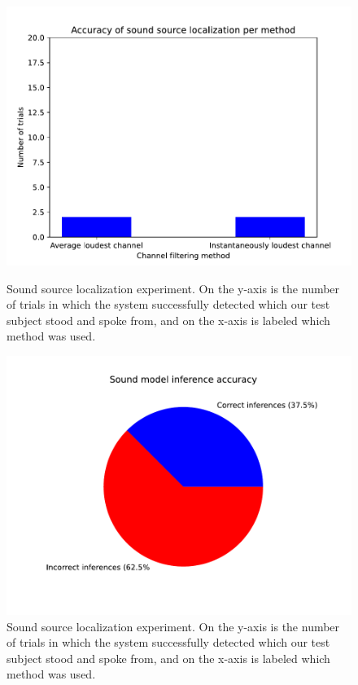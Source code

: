 \documentclass{article}
\begin{document}
\begin{figure}[ht]
\begin{center}
\centerline{\includegraphics[width=\columnwidth]{localization_test}}
\caption{Sound source localization experiment. On the y-axis is the number of trials in which the system successfully detected which our test subject stood and spoke from, and on the x-axis is labeled which method was used.}
\centerline{\includegraphics[width=\columnwidth]{sound_model_accuracy_chart}}
\caption{Sound source localization experiment. On the y-axis is the number of trials in which the system successfully detected which our test subject stood and spoke from, and on the x-axis is labeled which method was used.}
\end{center}
\end{figure}
\end{document}
